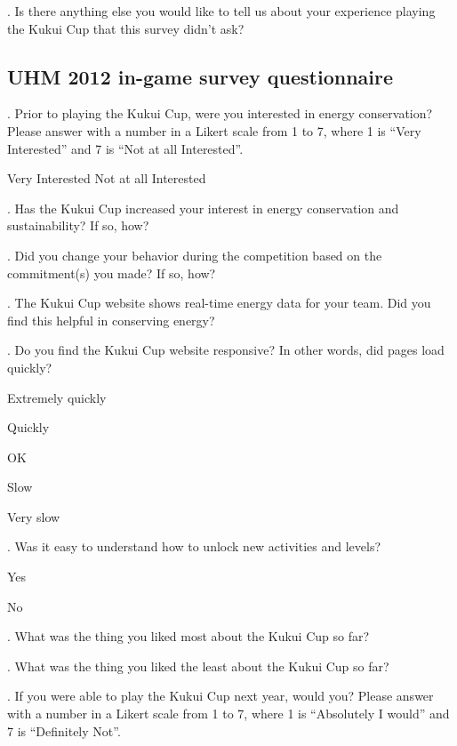 . Is there anything else you would like to tell us about your experience playing the Kukui Cup that this survey didn't ask?

\subsection {UHM 2012 in-game survey questionnaire}

. Prior to playing the Kukui Cup, were you interested in energy conservation? Please answer with a number in a Likert scale from 1 to 7, where 1 is ``Very Interested'' and 7 is ``Not at all Interested''.

\indent \indent Very Interested                \indent Not at all Interested

. Has the Kukui Cup increased your interest in energy conservation and sustainability? If so, how?

. Did you change your behavior during the competition based on the commitment(s) you made? If
so, how?

. The Kukui Cup website shows real-time energy data for your team. Did you find this helpful in
conserving energy?

. Do you find the Kukui Cup website responsive? In other words, did pages load quickly?
\begin{radiobutton}
	\item Extremely quickly 
	\item Quickly 
	\item OK 
	\item Slow 
	\item Very slow
\end{radiobutton}

. Was it easy to understand how to unlock new activities and levels?
\begin{radiobutton}
	\item Yes
	\item No 
\end{radiobutton}

. What was the thing you liked most about the Kukui Cup so far?

. What was the thing you liked the least about the Kukui Cup so far?

. If you were able to play the Kukui Cup next year, would you? Please answer with a number in a Likert scale from 1 to 7, where 1 is ``Absolutely I would'' and 7 is ``Definitely Not''.

